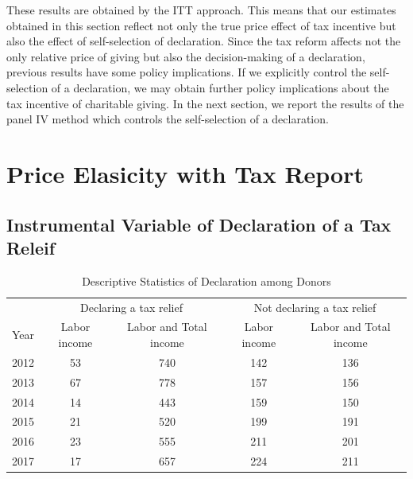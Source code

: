 \documentclass[
  11pt,
  a4paper,
]{article}
\begin{document}
These results are obtained by the ITT approach.
This means that our estimates obtained in this section reflect not only
the true price effect of tax incentive but also the effect of self-selection of declaration.
Since the tax reform affects not the only relative price of giving but also the decision-making of a declaration,
previous results have some policy implications.
If we explicitly control the self-selection of a declaration,
we may obtain further policy implications about the tax incentive of charitable giving.
In the next section, we report the results of the panel IV method which controls the self-selection of a declaration.

\hypertarget{price-elasicity-with-tax-report}{%
\section{Price Elasicity with Tax Report}\label{price-elasicity-with-tax-report}}

\hypertarget{instrumental-variable-of-declaration-of-a-tax-releif}{%
\subsection{Instrumental Variable of Declaration of a Tax Releif}\label{instrumental-variable-of-declaration-of-a-tax-releif}}

\begin{table}

\caption{\label{tab:SummaryDeduct}Descriptive Statistics of Declaration among Donors}
\centering
\fontsize{9}{11}\selectfont
\begin{tabular}[t]{lcccc}
\toprule
\multicolumn{1}{c}{} & \multicolumn{2}{c}{Declaring a tax relief} & \multicolumn{2}{c}{Not declaring a tax relief} \\
\cmidrule(l{3pt}r{3pt}){2-3} \cmidrule(l{3pt}r{3pt}){4-5}
Year & Labor income & Labor and Total income & Labor income & Labor and Total income\\
\midrule
2012 & 53 & 740 & 142 & 136\\
2013 & 67 & 778 & 157 & 156\\
2014 & 14 & 443 & 159 & 150\\
2015 & 21 & 520 & 199 & 191\\
2016 & 23 & 555 & 211 & 201\\
2017 & 17 & 657 & 224 & 211\\
\bottomrule
\end{tabular}
\end{table}
\end{document}
